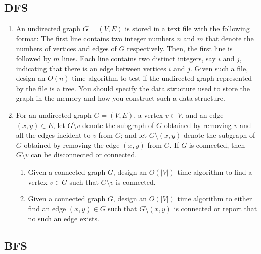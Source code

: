 \begin{refsection}
\subsection{DFS}
\begin{Exercise}
\begin{enumerate}
\item An undirected graph $G = (V, E)$ is stored in a text file with the following format: The first line contains two integer numbers $n$ and $m$ that denote the numbers of vertices and edges of $G$ respectively. Then, the first line is followed by $m$ lines. Each line contains two distinct integers, say $i$ and $j$, indicating that there is an edge between vertices $i$ and $j$. Given such a file, design an $O(n)$ time algorithm to test if the undirected graph represented by the file is a tree. You should specify the data structure used to store the graph in the memory and how you construct such a data structure.  
\item For an undirected graph $G = (V, E)$, a vertex $v \in V$, and an edge $(x, y) \in E$, let $G\setminus v$ denote the subgraph of $G$ obtained by removing $v$ and all the edges incident to $v$ from $G$; and let $G\setminus(x, y)$ denote the subgraph of $G$ obtained by removing the edge $(x, y)$ from $G$. If $G$ is connected, then $G\setminus v$ can be disconnected or connected.
\begin{enumerate}
\item Given a connected graph $G$, design an $O(|V|)$ time algorithm to find a vertex $v \in G$ such that $G\setminus v$ is connected.
\item Given a connected graph $G$, design an $O(|V|)$ time algorithm to either find an edge $(x, y) \in G$ such that $G\setminus (x, y)$  is connected or report that no such an edge exists. 
\end{enumerate}
\end{enumerate}
\end{Exercise}
\begin{Answer}
\end{Answer}

\subsection{BFS}


\end{refsection}
